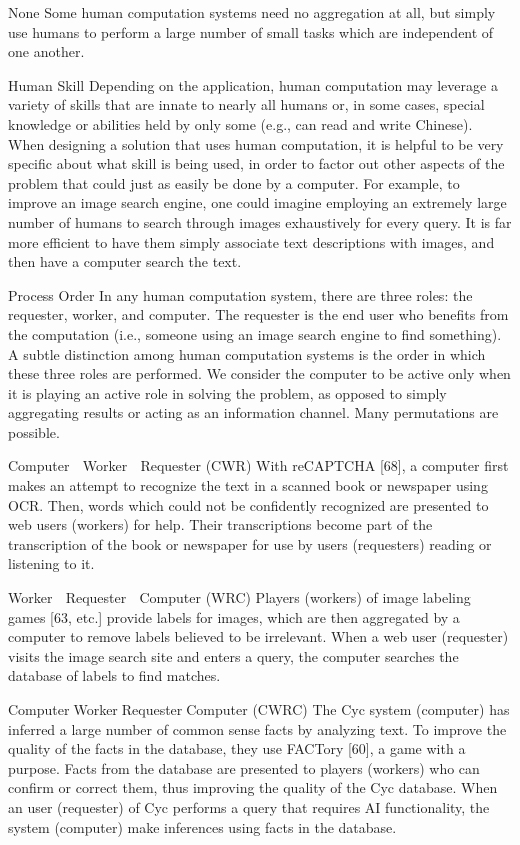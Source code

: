 \documentclass{acm_proc_article-sp} %
\begin{document}
None Some human computation systems need no aggregation at all, but simply use humans to perform a large number of small tasks which are independent of one another. 

Human Skill Depending on the application, human computation may leverage a variety of skills that are innate to nearly all humans or, in some cases, special knowledge or abilities held by only some (e.g., can read and write Chinese). When designing a solution that uses human computation, it is helpful to be very specific about what skill is being used, in order to factor out other aspects of the problem that could just as easily be done by a computer. For example, to improve an image search engine, one could imagine employing an extremely large number of humans to search through images exhaustively for every query. It is far more efficient to have them simply associate text descriptions with images, and then have a computer search the text. 

Process Order In any human computation system, there are three roles: the requester, worker, and computer. The requester is the end user who benefits from the computation (i.e., someone using an image search engine to find something). A subtle distinction among human computation systems is the order in which these three roles are performed. We consider the computer to be active only when it is playing an active role in solving the problem, as opposed to simply aggregating results or acting as an information channel. Many permutations are possible.

Computer  Worker  Requester (CWR) With reCAPTCHA [68], a computer first makes an attempt to recognize the text in a scanned book or newspaper using OCR. Then, words which could not be confidently recognized are presented to web users (workers) for help. Their transcriptions become part of the transcription of the book or newspaper for use by users (requesters) reading or listening to it. 

Worker  Requester  Computer (WRC) Players (workers) of image labeling games [63, etc.] provide labels for images, which are then aggregated by a computer to remove labels believed to be irrelevant. When a web user (requester) visits the image search site and enters a query, the computer searches the database of labels to find matches. 

ComputerWorkerRequesterComputer (CWRC) The Cyc system (computer) has inferred a large number of common sense facts by analyzing text. To improve the quality of the facts in the database, they use FACTory [60], a game with a purpose. Facts from the database are presented to players (workers) who can confirm or correct them, thus improving the quality of the Cyc database. When an user (requester) of Cyc performs a query that requires AI functionality, the system (computer) make inferences using facts in the database. 
\end{document}
